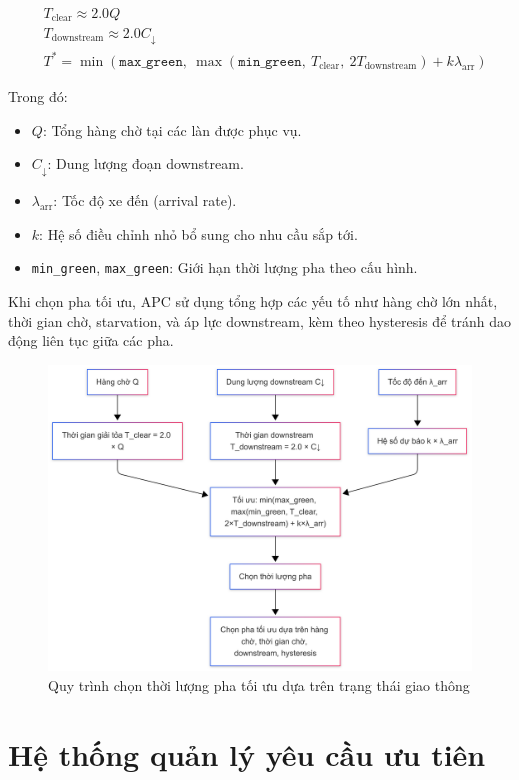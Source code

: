 \begin{align*}
    &T_{\text{clear}} \approx 2.0 Q \\
    &T_{\text{downstream}} \approx 2.0 C_{\downarrow} \\
    &T^* = \min\left(\texttt{max\_green},\ \max\left(\texttt{min\_green},\ T_{\text{clear}},\ 2T_{\text{downstream}}\right) + k \lambda_{\text{arr}}\right)
\end{align*}

Trong đó:
\begin{itemize}
    \item $Q$: Tổng hàng chờ tại các làn được phục vụ.
    \item $C_{\downarrow}$: Dung lượng đoạn downstream.
    \item $\lambda_{\text{arr}}$: Tốc độ xe đến (arrival rate).
    \item $k$: Hệ số điều chỉnh nhỏ bổ sung cho nhu cầu sắp tới.
    \item \texttt{min\_green}, \texttt{max\_green}: Giới hạn thời lượng pha theo cấu hình.
\end{itemize}

Khi chọn pha tối ưu, APC sử dụng tổng hợp các yếu tố như hàng chờ lớn nhất, thời gian chờ, starvation, và áp lực downstream, kèm theo hysteresis để tránh dao động liên tục giữa các pha.


\begin{figure}
    \centering
    \includegraphics[width=0.75\linewidth]{Untitled diagram _ Mermaid Chart-2025-08-26-094113.png}
    \caption{Quy trình chọn thời lượng pha tối ưu dựa trên trạng thái giao thông}
    \label{fig:optimal_time_decision}
\end{figure}


\section{Hệ thống quản lý yêu cầu ưu tiên}

